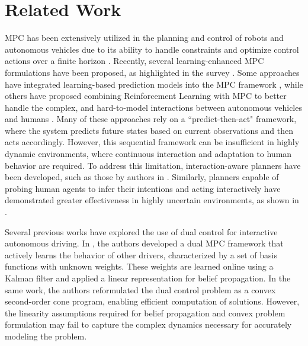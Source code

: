 \section{Related Work}
MPC has been extensively utilized in the planning and control of robots and autonomous vehicles due to its ability to handle constraints and optimize control actions over a finite horizon \cite{yu2021model}. Recently, several learning-enhanced MPC formulations have been proposed, as highlighted in the survey \cite{aradi2020survey}. Some approaches have integrated learning-based prediction models into the MPC framework \cite{le2024multi}, while others have proposed combining Reinforcement Learning with MPC to better handle the complex, and hard-to-model interactions between autonomous vehicles and humans \cite{albarella2023hybrid,kimura2022decision}. Many of these approaches rely on a ``predict-then-act" framework, where the system predicts future states based on current observations and then acts accordingly. However,  this sequential framework can be insufficient in highly dynamic environments, where continuous interaction and adaptation to human behavior are required. To address this limitation, interaction-aware planners have been developed, such as those by authors in \cite{le2024multi,gupta2023interaction}. Similarly, planners capable of probing human agents to infer their intentions and acting interactively have demonstrated greater effectiveness in highly uncertain environments, as shown in \cite{wang2023active}. %

 
Several previous works have explored the use of dual control for interactive autonomous driving.
In \cite{nair2022stochastic}, the authors developed a dual MPC framework that actively learns the behavior of other drivers, characterized by a set of basis functions with unknown weights. 
These weights are learned online using a Kalman filter and applied a linear representation for belief propagation.
In the same work, the authors reformulated the dual control problem as a convex second-order cone program, enabling efficient computation of solutions.
However, the linearity assumptions required for belief propagation and convex problem formulation may fail to capture the complex dynamics necessary for accurately modeling the problem.

